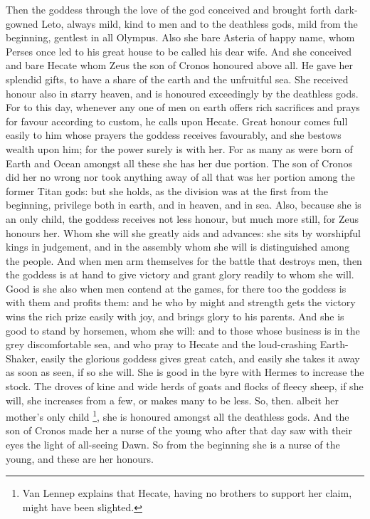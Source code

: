 Then the goddess through the love of the god conceived and brought forth
dark-gowned Leto, always mild, kind to men and to the deathless gods, mild from
the beginning, gentlest in all Olympus. Also she bare Asteria of happy name,
whom Perses once led to his great house to be called his dear wife. And she
conceived and bare Hecate whom Zeus the son of Cronos honoured above all. He
gave her splendid gifts, to have a share of the earth and the unfruitful sea.
She received honour also in starry heaven, and is honoured exceedingly by the
deathless gods. For to this day, whenever any one of men on earth offers rich
sacrifices and prays for favour according to custom, he calls upon Hecate.
Great honour comes full easily to him whose prayers the goddess receives
favourably, and she bestows wealth upon him; for the power surely is with her.
For as many as were born of Earth and Ocean amongst all these she has her due
portion. The son of Cronos did her no wrong nor took anything away of all that
was her portion among the former Titan gods: but she holds, as the division was
at the first from the beginning, privilege both in earth, and in heaven, and in
sea. Also, because she is an only child, the goddess receives not less honour,
but much more still, for Zeus honours her. Whom she will she greatly aids and
advances: she sits by worshipful kings in judgement, and in the assembly whom
she will is distinguished among the people. And when men arm themselves for the
battle that destroys men, then the goddess is at hand to give victory and grant
glory readily to whom she will. Good is she also when men contend at the games,
for there too the goddess is with them and profits them: and he who by might
and strength gets the victory wins the rich prize easily with joy, and brings
glory to his parents. And she is good to stand by horsemen, whom she will: and
to those whose business is in the grey discomfortable sea, and who pray to
Hecate and the loud-crashing Earth-Shaker, easily the glorious goddess gives
great catch, and easily she takes it away as soon as seen, if so she will. She
is good in the byre with Hermes to increase the stock. The droves of kine and
wide herds of goats and flocks of fleecy sheep, if she will, she increases from
a few, or makes many to be less. So, then. albeit her mother’s only child
\footnote{Van Lennep explains that
Hecate, having no brothers to support her claim, might have been slighted.}, she is honoured amongst all the
deathless gods. And the son of Cronos made her a nurse of the young who after
that day saw with their eyes the light of all-seeing Dawn. So from the
beginning she is a nurse of the young, and these are her honours.

